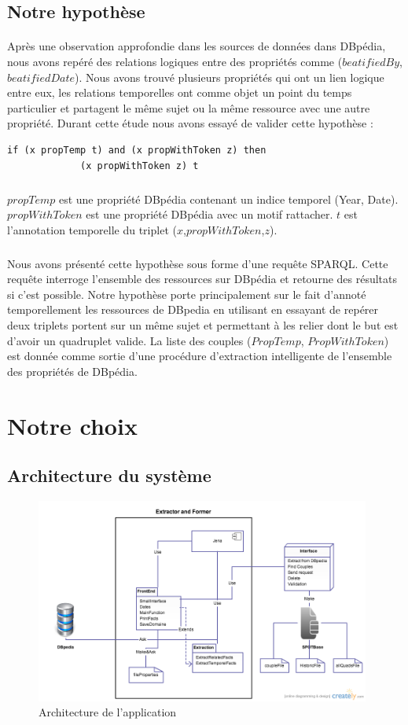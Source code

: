 \documentclass[12pt,a4	]{report}
\begin{document}
\subsection{Notre hypothèse}
\paragraph{}
Après une observation approfondie dans les sources de données dans DBpédia, nous avons repéré des relations logiques entre des propriétés comme ($beatifiedBy$, $beatifiedDate$). Nous avons trouvé plusieurs propriétés qui ont un lien logique entre eux, les relations temporelles ont comme objet un point du temps particulier et partagent le même sujet ou la même ressource avec une autre propriété.
Durant cette étude nous avons essayé de valider cette hypothèse :

\begin{verbatim}
if (x propTemp t) and (x propWithToken z) then
             (x propWithToken z) t 
\end{verbatim}

\subparagraph{}

$propTemp$ est une propriété DBpédia contenant un indice temporel (Year, Date).
\newline
$propWithToken$ est une propriété DBpédia avec un motif rattacher.
\newline
$t$ est l'annotation temporelle du triplet ($x$,$propWithToken$,$z$).

\subparagraph{}
Nous avons présenté cette hypothèse sous forme d'une requête SPARQL. Cette requête interroge l'ensemble des ressources sur DBpédia et retourne des résultats si c'est possible.
Notre hypothèse porte principalement sur le fait d'annoté temporellement les ressources de DBpedia en utilisant en essayant de repérer deux triplets portent sur un même sujet et permettant à les relier dont le but est d'avoir un quadruplet valide. La liste des couples ($PropTemp$, $PropWithToken$)
est donnée comme sortie d'une procédure d'extraction intelligente de l'ensemble des propriétés de DBpédia.
\section{Notre choix}
\subsection{Architecture du système}
 \begin{figure}[H]
        \centering
                \includegraphics[width=11cm]{Architecture.png}
               \caption{Architecture de l'application}
\end{figure}
\end{document}
